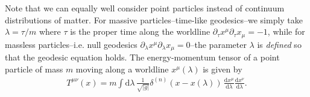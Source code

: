 {\begin{mytheorem}
Note that we can equally well consider point particles instead of continuum distributions of matter.
For massive particles--time-like geodesics--we simply take $\lambda=\tau/m$ where $\tau$ is the proper time along the worldline  $\partial_\tau x^\mu \partial_\tau x_\mu=-1$, while for massless particles--i.e. null geodesics $\partial_\lambda x^\mu \partial_\lambda x_\mu=0$--the parameter $\lambda$ is \emph{defined} so that the geodesic equation holds.
The energy-momentum tensor of a point particle of mass $m$ moving along a worldline $x^\mu(\lambda)$ is given by
\begin{align}
    T^{\mu\nu}(x) = m \int \mathrm{d}\lambda \, \frac{1}{\sqrt{|g|}} \delta^{(n)}(x - x(\lambda)) \, \frac{\mathrm{d}x^\mu}{\mathrm{d}\lambda} \frac{\mathrm{d}x^\nu}{\mathrm{d}\lambda}.
\end{align}
\end{mytheorem}
}




